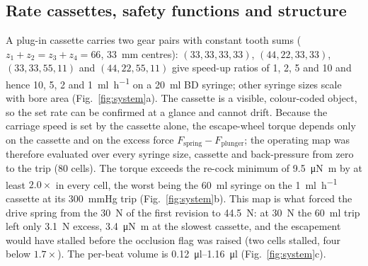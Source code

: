 \documentclass[11pt,a4paper]{article}
\begin{document}
\subsection{Rate cassettes, safety functions and structure}
A plug-in cassette carries two gear pairs with constant tooth sums ($z_1+z_2 = z_3+z_4 = 66$, \SI{33}{\milli\metre} centres): $(33,33,33,33)$, $(44,22,33,33)$, $(33,33,55,11)$ and $(44,22,55,11)$ give speed-up ratios of 1, 2, 5 and 10 and hence 10, 5, 2 and \SI{1}{\milli\litre\per\hour} on a \SI{20}{\milli\litre} BD syringe; other syringe sizes scale with bore area (Fig.~\ref{fig:system}a). The cassette is a visible, colour-coded object, so the set rate can be confirmed at a glance and cannot drift. Because the carriage speed is set by the cassette alone, the escape-wheel torque depends only on the cassette and on the excess force $F_{\mathrm{spring}} - F_{\mathrm{plunger}}$; the operating map was therefore evaluated over every syringe size, cassette and back-pressure from zero to the trip (80 cells). The torque exceeds the re-cock minimum of \SI{9.5}{\micro\newton\metre} by at least $2.0\times$ in every cell, the worst being the \SI{60}{\milli\litre} syringe on the \SI{1}{\milli\litre\per\hour} cassette at its \SI{300}{mmHg} trip (Fig.~\ref{fig:system}b). This map is what forced the drive spring from the \SI{30}{\newton} of the first revision to \SI{44.5}{\newton}: at \SI{30}{\newton} the \SI{60}{\milli\litre} trip left only \SI{3.1}{\newton} excess, \SI{3.4}{\micro\newton\metre} at the slowest cassette, and the escapement would have stalled before the occlusion flag was raised (two cells stalled, four below $1.7\times$). The per-beat volume is \SIrange{0.12}{1.16}{\micro\litre} (Fig.~\ref{fig:system}c).
\end{document}
